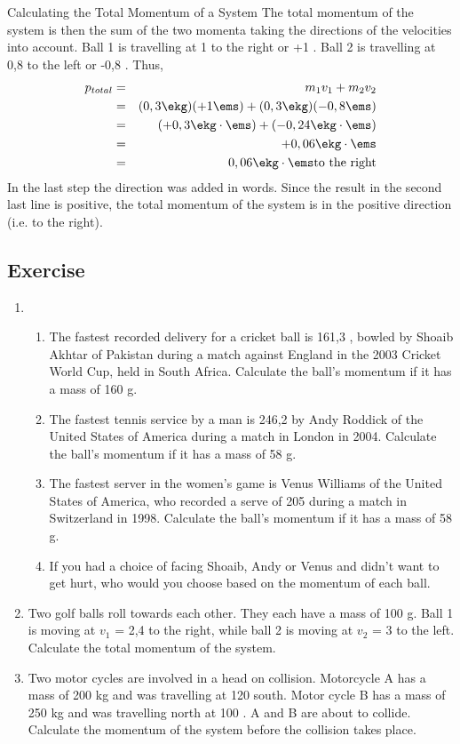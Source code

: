 \begin{wex}{Calculating the Total Momentum of a System}
{ The total momentum of the system is then the sum of the two momenta taking the
directions of the velocities into account. Ball 1 is travelling
at 1 \ms to the right or +1 \ms. Ball 2 is travelling at 0,8 \ms to the left or -0,8 \ms. Thus,
\begin{eqnarray*}
p_{total} &=& m_1 v_1 + m_2 v_2\\
&=& (0,3 \ekg)(+1 \ems) + (0,3 \ekg)(-0,8 \ems)\\
&=& (+0,3 \ekg\cdot\ems) + (-0,24 \ekg\cdot\ems) \\
&=& +0,06\ekg \cdot \ems\\
&=& 0,06\ekg \cdot \ems \mbox{to the right}
\end{eqnarray*}
In the last step the direction was added in words. Since the result
in the second last line is positive, the total momentum of the system
is in the positive direction (i.e. to the right).}
\end{wex}

\subsection{Exercise}
\begin{enumerate}
\item{\begin{enumerate}
\item{The fastest recorded delivery for a cricket ball is 161,3 \kph, bowled by Shoaib Akhtar of Pakistan during a match against England in the 2003 Cricket World Cup, held in South Africa. Calculate the ball's momentum if it has a mass of 160 g.}
\item{The fastest tennis service by a man is 246,2 \kph by Andy Roddick of the United States of America during a match in London in 2004. Calculate the ball's momentum if it has a mass of 58 g.}
\item{The fastest server in the women's game is Venus Williams of the United States of America, who recorded a serve of 205 \kph during a match in Switzerland in 1998. Calculate the ball's momentum if it has a mass of 58 g.}
\item{If you had a choice of facing Shoaib, Andy or Venus and didn't want to get hurt, who would you choose based on the momentum of each ball.}
\end{enumerate}}
\item{Two golf balls roll towards each other. They each have a mass of 100 g. Ball 1 is moving at $v_1$ = 2,4 \ms to the right, while ball 2 is moving at $v_2$ = 3 \ms to the left. Calculate the total momentum of the system.}
\item{Two motor cycles are involved in a head on collision. Motorcycle A has a mass of 200 kg and was travelling at 120 \kph south. Motor cycle B has a mass of 250 kg and was travelling north at 100 \kph. A and B are about to collide. Calculate the momentum of the system before the collision takes place.}
\end{enumerate}

